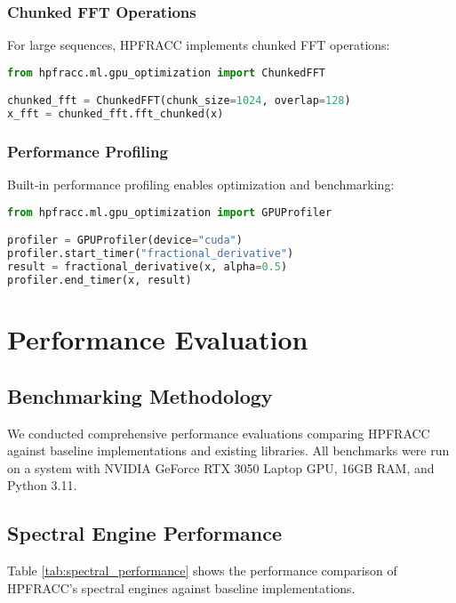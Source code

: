 \documentclass[12pt]{article}
\begin{document}
\subsubsection{Chunked FFT Operations}

For large sequences, HPFRACC implements chunked FFT operations:

\begin{lstlisting}[language=Python]
from hpfracc.ml.gpu_optimization import ChunkedFFT

chunked_fft = ChunkedFFT(chunk_size=1024, overlap=128)
x_fft = chunked_fft.fft_chunked(x)
\end{lstlisting}

\subsubsection{Performance Profiling}

Built-in performance profiling enables optimization and benchmarking:

\begin{lstlisting}[language=Python]
from hpfracc.ml.gpu_optimization import GPUProfiler

profiler = GPUProfiler(device="cuda")
profiler.start_timer("fractional_derivative")
result = fractional_derivative(x, alpha=0.5)
profiler.end_timer(x, result)
\end{lstlisting}

\section{Performance Evaluation}

\subsection{Benchmarking Methodology}

We conducted comprehensive performance evaluations comparing HPFRACC against baseline implementations and existing libraries. All benchmarks were run on a system with NVIDIA GeForce RTX 3050 Laptop GPU, 16GB RAM, and Python 3.11.

\subsection{Spectral Engine Performance}

Table \ref{tab:spectral_performance} shows the performance comparison of HPFRACC's spectral engines against baseline implementations.
\end{document}
